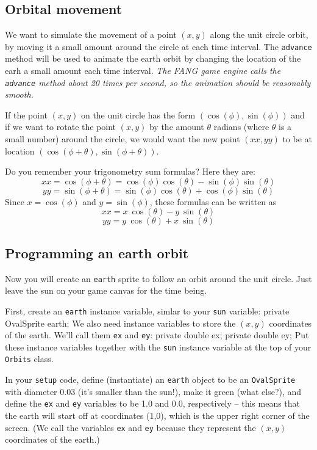 \documentclass[11pt]{article}
\newenvironment{qv}%
  {\quote
   \verbatim}%
  {\endverbatim
   \endquote}
\begin{document}
\subsection*{Orbital movement}
We want to simulate the movement of a point $(x,y)$
along the unit circle orbit,
by moving it a small amount around the circle at each time interval.
The \verb'advance' method will be used to animate the earth orbit
by changing the location of the earh a small amount each time interval.
{\em The FANG game engine calls the \verb'advance' method
about 20 times per second, so the animation should be reasonably smooth.}

If the point $(x,y)$ on the unit circle has the form
$(\cos(\phi), \sin(\phi))$
and if we want to rotate the point $(x,y)$ by the amount $\theta$ radians
(where $\theta$ is a small number) around the circle,
we would want the new point $(xx, yy)$ to be at location
$(\cos(\phi+\theta), \sin(\phi+\theta))$.

Do you remember your trigonometry sum formulas?  Here they are:
\[xx = \cos(\phi+\theta) =
  \cos(\phi)\cos(\theta) -
  \sin(\phi)\sin(\theta)\]
\[yy = \sin(\phi+\theta) =
  \sin(\phi)\cos(\theta) +
  \cos(\phi)\sin(\theta)\]
Since $x=\cos(\phi)$ and $y=\sin(\phi)$,
these formulas can be written as
\[xx =
  x\:\cos(\theta) -
  y\:\sin(\theta)\]
\[yy =
  y\:\cos(\theta) +
  x\:\sin(\theta)\]

\subsection*{Programming an earth orbit}

Now you will create an {\tt earth} sprite to follow an orbit
around the unit circle.
Just leave the sun on your game canvas for the time being.

First, create an {\tt earth} instance variable,
simlar to your {\tt sun} variable:
\begin{qv}
private OvalSprite earth;
\end{qv}
We also need instance variables
to store the $(x,y)$ coordinates of the earth.
We'll call them {\tt ex} and {\tt ey}:
\begin{qv}
private double ex;
private double ey;
\end{qv}
Put these instance variables together with the \verb'sun' instance variable
at the top of your \verb'Orbits' class.

In your {\tt setup} code,
define (instantiate) an {\tt earth} object to be an {\tt OvalSprite}
with diameter 0.03 (it's smaller than the sun!),
make it green (what else?),
and define the {\tt ex} and {\tt ey} variables
to be 1.0 and 0.0, respectively --
this means that the earth will start off at coordinates (1,0),
which is the upper right corner of the screen.
(We call the variables \verb'ex' and \verb'ey'
because they represent the $(x,y)$ coordinates of the earth.)
\end{document}
